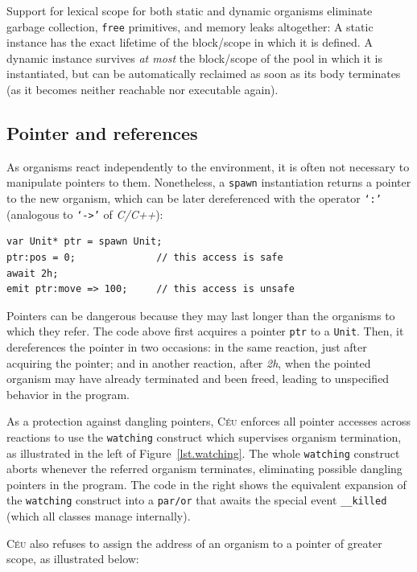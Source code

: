 \documentclass{sigplanconf}
\newcommand{\CEU}{\textsc{C\'{e}u}\xspace}
\newcommand{\code}[1] {{\small{\texttt{#1}}}}
\newcommand{\1}{\;}
\newcommand{\2}{\;\;}
\newcommand{\3}{\;\;\;}
\newcommand{\5}{\;\;\;\;\;}
\begin{document}
Support for lexical scope for both static and dynamic organisms eliminate 
garbage collection, \code{free} primitives, and memory leaks altogether:
A static instance has the exact lifetime of the block/scope in which it is 
defined.
A dynamic instance survives \emph{at most} the block/scope of the pool in which 
it is instantiated, but can be automatically reclaimed as soon as its body 
terminates (as it becomes neither reachable nor executable again).


\subsection{Pointer and references}
\label{sec.orgs.refs}

As organisms react independently to the environment, it is often not necessary 
to manipulate pointers to them.
%
Nonetheless, a \code{spawn} instantiation returns a pointer to the new 
organism, which can be later dereferenced with the operator \code{`:'} 
(analogous to \code{`->'} of \emph{C/C++}):

\begin{lstlisting}
var Unit* ptr = spawn Unit;
ptr:pos = 0;              // this access is safe
await 2h;
emit ptr:move => 100;     // this access is unsafe
\end{lstlisting}

Pointers can be dangerous because they may last longer than the organisms to 
which they refer.
%
The code above first acquires a pointer \code{ptr} to a \code{Unit}.
Then, it dereferences the pointer in two occasions:
in the same reaction, just after acquiring the pointer;
and in another reaction, after \emph{2h}, when the pointed organism may have 
already terminated and been freed, leading to unspecified behavior in the 
program.

As a protection against dangling pointers, \CEU enforces all pointer accesses 
across reactions to use the \code{watching} construct which supervises organism 
termination, as illustrated in the left of Figure~\ref{lst.watching}.
%
The whole \code{watching} construct aborts whenever the referred organism 
terminates, eliminating possible dangling pointers in the program.
%
The code in the right shows the equivalent expansion of the \code{watching} 
construct into a \code{par/or} that awaits the special event \code{\_\_killed} 
(which all classes manage internally).

\CEU also refuses to assign the address of an organism to a pointer of greater 
scope, as illustrated below:
\end{document}
